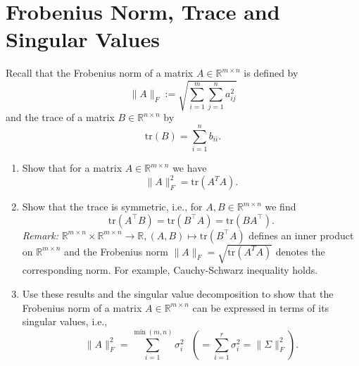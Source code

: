 \section{Frobenius Norm, Trace and Singular Values}
Recall that the Frobenius norm of a matrix $A  \in \mathbb{R}^{m \times n}$ is defined by 
$$\|A\|_F := \sqrt{\sum_{i=1}^m \sum_{j=1}^n a_{ij}^2} $$ and the trace of a matrix $B \in \mathbb{R}^{n \times n}$ by
$$ \text{tr}(B) = \sum_{i=1}^n b_{ii}.$$
\begin{enumerate}
	\item Show that for a matrix $A  \in \mathbb{R}^{m \times n}$ we have $$\|A\|_F^2 = \text{tr}(A^TA).$$
	\item Show that the trace is symmetric, i.e., for $A,B \in \mathbb{R}^{m \times n}$ we find $$\text{tr}(A^\top B)=  \text{tr}(B^\top A ) = \text{tr}(BA^\top ) .$$
	{\color{navy}\textit{Remark:} $\mathbb{R}^{m \times n} \times \mathbb{R}^{m \times n} \to \mathbb{R}, (A,B) \mapsto \text{tr}(B^\top A)$ defines an inner product on $\mathbb{R}^{m \times n}$ and the Frobenius norm $\|A\|_F  = \sqrt{\text{tr}(A^TA)}$ denotes the corresponding norm. For example, Cauchy-Schwarz inequality holds.}
	\item Use these results and the singular value decomposition to show that the Frobenius norm of a matrix $A \in \mathbb{R}^{m \times n}$ can be expressed in terms of its singular values, i.e., $$\|A\|_F^2 = \sum_{i=1}^{\min(m,n)} \sigma_i^2 ~~~\left(= \sum_{i=1}^{r} \sigma_i^2 = \|\Sigma\|^2_F\right).$$
\end{enumerate}